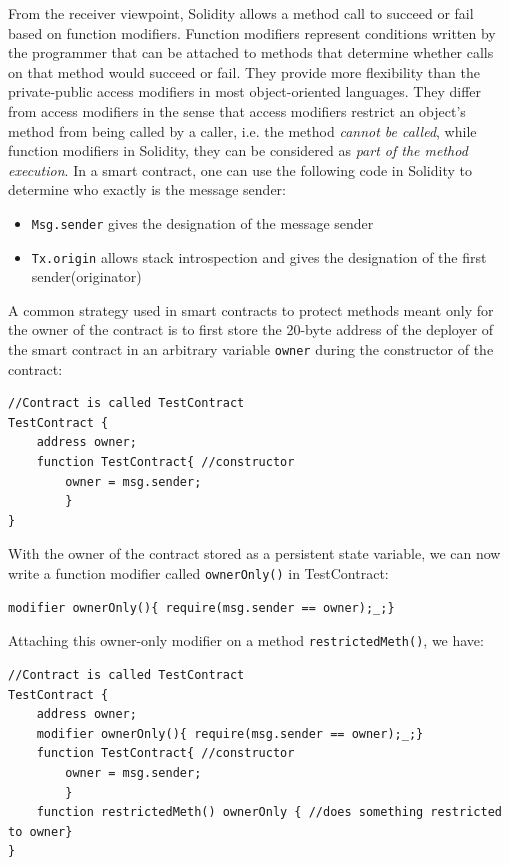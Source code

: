 \documentclass[a4paper,11pt,twoside]{article}
\begin{document}
{From the receiver viewpoint, Solidity allows a method call to succeed or fail based on function modifiers. Function modifiers represent conditions written by the programmer that can be attached to methods that determine whether calls on that method would succeed or fail. They provide more flexibility than the private-public access modifiers in most object-oriented languages. They differ from access modifiers in the sense that access modifiers restrict an object's method from being called by a caller, i.e. the method \textit{cannot be called}, while function modifiers in Solidity, they can be considered as \textit{part of the method execution}. In a smart contract, one can use the following code in Solidity to determine who exactly is the message sender:
\begin{itemize}
\item \texttt{Msg.sender} gives the designation of the message sender
\item \texttt{Tx.origin} allows stack introspection and gives the designation of the first sender(originator)
\end{itemize}

A common strategy used in smart contracts to protect methods meant only for the owner of the contract is to first store the 20-byte address of the deployer of the smart contract in an arbitrary variable \texttt{owner} during the constructor of the contract:\\

\begin{lstlisting}
//Contract is called TestContract
TestContract {
	address owner;
	function TestContract{ //constructor
		owner = msg.sender;
		}
}
\end{lstlisting}

With the owner of the contract stored as a persistent state variable, we can now write a function modifier called \texttt{ownerOnly()} in TestContract:
\begin{lstlisting}
modifier ownerOnly(){ require(msg.sender == owner);_;}
\end{lstlisting}

Attaching this owner-only modifier on a method \texttt{restrictedMeth()}, we have:

\begin{lstlisting}
//Contract is called TestContract
TestContract {
	address owner;
	modifier ownerOnly(){ require(msg.sender == owner);_;}
	function TestContract{ //constructor
		owner = msg.sender;
		}
	function restrictedMeth() ownerOnly { //does something restricted to owner}
}
\end{lstlisting}

}
\end{document}
